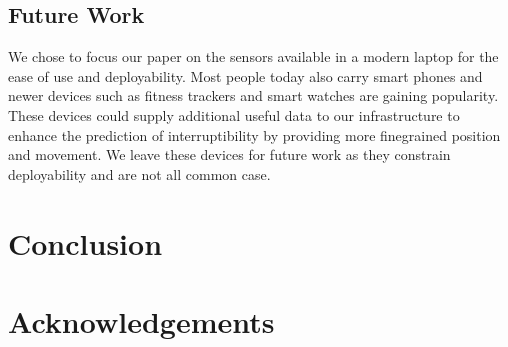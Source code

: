 \documentclass{sigchi}
\begin{document}
\subsection{Future Work}

We chose to focus our paper on the sensors available in a modern laptop for the ease of use and deployability.
Most people today also carry smart phones and newer devices such as fitness trackers and smart watches are gaining popularity.
These devices could supply additional useful data to our infrastructure to enhance the prediction of interruptibility by providing more finegrained position and movement.
We leave these devices for future work as they constrain deployability and are not all common case.


\section{Conclusion}

\section{Acknowledgements}

\balance



\end{document}
